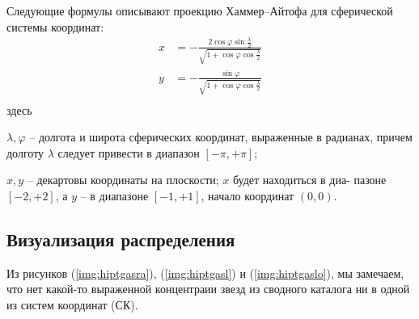 \documentclass[14pt]{article} %
\begin{document}
Следующие формулы описывают проекцию Хаммер–Айтофа для
сферической системы координат:
\begin{equation*}
\begin{array}{cl}
x&=-\frac{2  \cos \varphi \sin \frac{\lambda}{2}}{\sqrt{1 + \cos \varphi \cos \frac{\lambda}{2}}}\\
y&=-\frac{\sin \varphi}{\sqrt{1 + \cos \varphi \cos \frac{\lambda}{2}}}\\
\end{array}
\end{equation*}
здесь

$\lambda, \varphi$ – долгота и широта сферических координат, выраженные в радианах, причем долготу $\lambda$ следует привести в диапазон $\left[ -\pi,+\pi\right]$;

$x, y$ – декартовы координаты на плоскости; $x$ будет находиться в диа-
пазоне $\left[-2, +2\right]$, а $y$ – в диапазоне $\left[-1, +1\right]$, начало координат $(0, 0)$.


\subsection{Визуализация распределения}\label{sub:smthrs}

Из  рисунков (\ref{img:hiptgasra}), (\ref{img:hiptgasl}) и  (\ref{img:hiptgaslo}), мы замечаем, что нет какой-то выраженной концентраии звезд из сводного каталога ни в одной из систем координат (СК).
\end{document}
